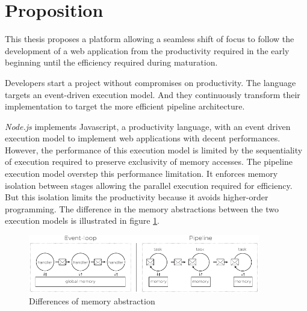 \section{Proposition} \label{chapter4:proposition}

This thesis proposes a platform allowing a seamless shift of focus to follow the development of a web application from the productivity required in the early beginning until the efficiency required during maturation.

Developers start a project without compromises on productivity.
The language targets an event-driven execution model.
And they continuously transform their implementation to target the more efficient pipeline architecture.



\textit{Node.js} implements Javascript, a productivity language, with an event driven execution model to implement web applications with decent performances.
However, the performance of this execution model is limited by the sequentiality of execution required to preserve exclusivity of memory accesses.
The pipeline execution model overstep this performance limitation.
It enforces memory isolation between stages allowing the parallel execution required for efficiency.
But this isolation limits the productivity because it avoids higher-order programming.
The difference in the memory abstractions between the two execution models is illustrated in figure \ref{fig:difference}.

\begin{figure}[h!]
\begin{center}
\includegraphics[width=0.9\textwidth]{../resources/models-difference.pdf}
\end{center}
\caption{Differences of memory abstraction}
\label{fig:difference}
\end{figure}


